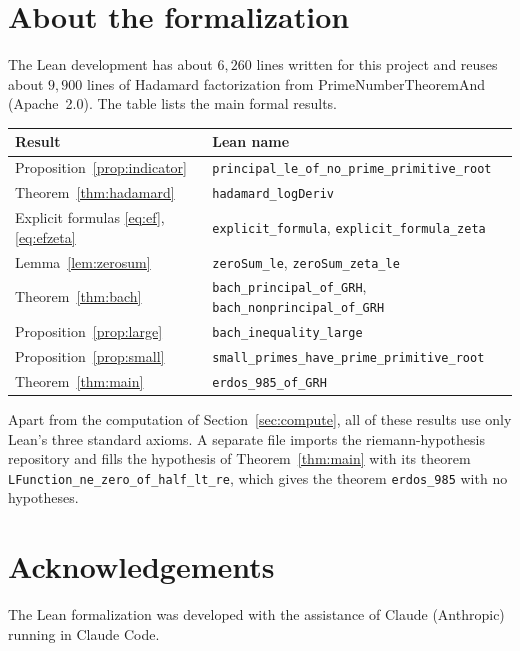 \documentclass[11pt]{amsart}
\theoremstyle{definition}
\theoremstyle{remark}
\newcommand{\lean}[1]{\texttt{#1}}
\begin{document}
\section{About the formalization}

The Lean development has about $6{,}260$ lines written for this project and reuses about $9{,}900$ lines of Hadamard factorization from PrimeNumberTheoremAnd \cite{pntplus} (Apache~2.0). The table lists the main formal results.

\begin{center}
\small
\begin{tabular}{@{}ll@{}}
\toprule
Result & Lean name\\
\midrule
Proposition~\ref{prop:indicator} & \lean{principal\_le\_of\_no\_prime\_primitive\_root}\\
Theorem~\ref{thm:hadamard} & \lean{hadamard\_logDeriv}\\
Explicit formulas \eqref{eq:ef}, \eqref{eq:efzeta} & \lean{explicit\_formula}, \lean{explicit\_formula\_zeta}\\
Lemma~\ref{lem:zerosum} & \lean{zeroSum\_le}, \lean{zeroSum\_zeta\_le}\\
Theorem~\ref{thm:bach} & \lean{bach\_principal\_of\_GRH}, \lean{bach\_nonprincipal\_of\_GRH}\\
Proposition~\ref{prop:large} & \lean{bach\_inequality\_large}\\
Proposition~\ref{prop:small} & \lean{small\_primes\_have\_prime\_primitive\_root}\\
Theorem~\ref{thm:main} & \lean{erdos\_985\_of\_GRH}\\
\bottomrule
\end{tabular}
\end{center}

Apart from the computation of Section~\ref{sec:compute}, all of these results use only Lean's three standard axioms. A separate file imports the riemann-hypothesis repository and fills the hypothesis of Theorem~\ref{thm:main} with its theorem \lean{LFunction\_ne\_zero\_of\_half\_lt\_re}, which gives the theorem \lean{erdos\_985} with no hypotheses.

\section*{Acknowledgements}
The Lean formalization was developed with the assistance of Claude (Anthropic) running in Claude Code.
\end{document}
